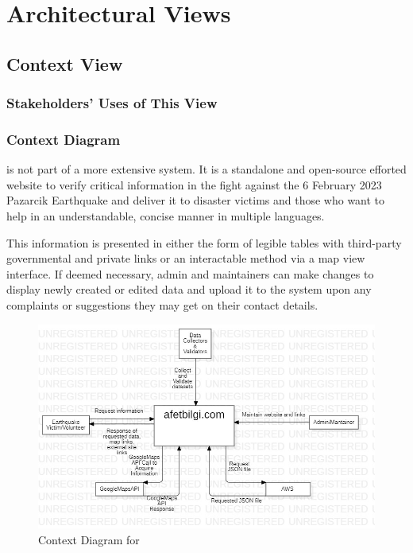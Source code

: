 \section{Architectural Views}

\subsection{Context View}

\subsubsection{Stakeholders' Uses of This View}

\subsubsection{Context Diagram}

\afetbilgi \cite{afetbilgi} is not part of a more extensive system. It is a standalone and open-source efforted website to verify critical information in the fight against the 6 February 2023 Pazarcik Earthquake and deliver it to disaster victims and those who want to help in an understandable, concise manner in multiple languages.

This information is presented in either the form of legible tables with third-party governmental and private links or an interactable method via a map view interface. If deemed necessary, admin and maintainers can make changes to display newly created or edited data and upload it to the system upon any complaints or suggestions they may get on their contact details.

\begin{figure}[H]
  \centering
  \includegraphics[width=\linewidth]{img/context-diagram.jpg}
  \caption{Context Diagram for \afetbilgi}
\end{figure}

